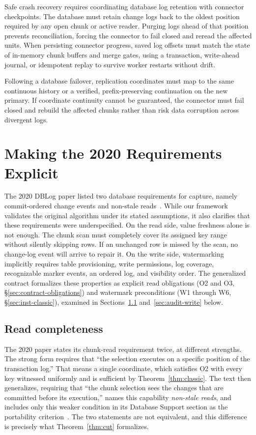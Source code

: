 \documentclass[sigconf,nonacm,10pt]{acmart}
\theoremstyle{plain}
\theoremstyle{definition}
\begin{document}
Safe crash recovery requires coordinating database log retention with 
connector checkpoints. The database must retain change logs back to the 
oldest position required by any open chunk or active reader. Purging 
logs ahead of that position prevents reconciliation, forcing the connector 
to fail closed and reread the affected units. When persisting connector 
progress, saved log offsets must match the state of in-memory chunk 
buffers and merge gates, using a transaction, write-ahead journal, or 
idempotent replay to survive worker restarts without drift.

Following a database failover, replication coordinates must map to the same continuous 
history or a verified, prefix-preserving continuation on the new primary. If coordinate 
continuity cannot be guaranteed, the connector must fail closed and rebuild the affected 
chunks rather than risk data corruption across divergent logs.

\FloatBarrier

\section{Making the 2020 Requirements Explicit}\label{sec:audit}

The 2020 DBLog paper listed two database requirements for capture, namely  
commit-ordered change events and non-stale reads~\cite{andreakis2020dblog}. 
While our framework validates the original algorithm under its stated assumptions,
it also clarifies that
these requirements were underspecified. On the read side, value
freshness alone is not enough. The chunk scan must completely cover its assigned 
key range without silently skipping rows. If an unchanged row is missed by the 
scan, no change-log event will arrive to repair it.
On the write side, watermarking implicitly requires table provisioning, write 
permissions, log coverage, recognizable marker events, an ordered log, and
visibility order.
The generalized contract formalizes these properties as explicit read 
obligations (O2 and O3, \S\ref{sec:contract-obligations}) and watermark 
preconditions (W1 through W6, \S\ref{sec:inst-classic}), examined in
Sections~\ref{sec:audit-read} and~\ref{sec:audit-write} below.

\subsection{Read completeness}\label{sec:audit-read}

The 2020 paper states its chunk-read requirement twice, at different 
strengths. The strong form requires that ``the selection executes on a specific 
position of the transaction log.'' That means a single coordinate, which
satisfies O2 with every key witnessed uniformly and is
sufficient by Theorem~\ref{thm:classic}. The text then generalizes, requiring 
that ``the chunk selection sees the changes that are committed before its 
execution,'' names this capability \emph{non-stale reads}, and includes only 
this weaker condition in its Database Support section as the portability 
criterion~\cite{andreakis2020dblog}. The two statements are not equivalent, 
and this difference is precisely what Theorem~\ref{thm:cut} formalizes.
\end{document}
